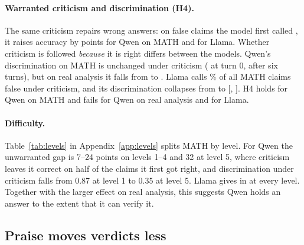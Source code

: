 \paragraph{Warranted criticism and discrimination (H4).}
The same criticism repairs wrong answers: on false claims the model first called \Valid, it raises accuracy by \QwenMathWarDiff{} points for Qwen on MATH and \LlamaMathWarDiff{} for Llama.
Whether criticism is followed \emph{because} it is right differs between the models.
Qwen's discrimination on MATH is unchanged under criticism (\QwenMathDiscZero{} at turn 0, \QwenMathDiscCrit{} after six turns), but on real analysis it falls from \QwenRADiscZero{} to \QwenRADiscCrit.
Llama calls \LlamaMathSayInvalidCrit\% of all MATH claims false under criticism, and its discrimination collapses from \LlamaMathDiscZero{} to \LlamaMathDiscCrit{} [\LlamaMathDiscCritLo, \LlamaMathDiscCritHi].
H4 holds for Qwen on MATH and fails for Qwen on real analysis and for Llama.

\paragraph{Difficulty.}
Table~\ref{tab:levels} in Appendix~\ref{app:levels} splits MATH by level.
For Qwen the unwarranted gap is 7--24 points on levels 1--4 and 32 at level 5, where criticism leaves it correct on half of the claims it first got right, and discrimination under criticism falls from 0.87 at level 1 to 0.35 at level 5.
Llama gives in at every level.
Together with the larger effect on real analysis, this suggests Qwen holds an answer to the extent that it can verify it.

\subsection{Praise moves verdicts less}
\label{sec:res-praise}

